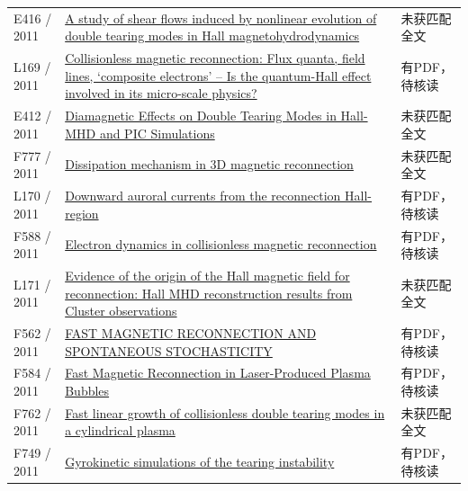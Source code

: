 \begin{longtable}{P{24mm}P{97mm}P{27mm}}
E416 / 2011 & \href{https://doi.org/10.1140/epjd/e2011-20106-4}{A study of shear flows induced by nonlinear evolution of double tearing modes in Hall magnetohydrodynamics} & 未获匹配全文\\

L169 / 2011 & \href{https://doi.org/10.48550/arxiv.1103.1076}{Collisionless magnetic reconnection: Flux quanta,  field lines,  `composite electrons' -- Is the quantum-Hall effect involved in its micro-scale physics?} & 有PDF，待核读\\

E412 / 2011 & \href{https://ui.adsabs.harvard.edu/abs/2011APS..DPPNP9019A/abstract}{Diamagnetic Effects on Double Tearing Modes in Hall-MHD and PIC Simulations} & 未获匹配全文\\

F777 / 2011 & \href{https://doi.org/10.1063/1.3642609}{Dissipation mechanism in 3D magnetic reconnection} & 未获匹配全文\\

L170 / 2011 & \href{https://doi.org/10.5194/angeo-29-679-2011}{Downward auroral currents from the reconnection Hall-region} & 有PDF，待核读\\

F588 / 2011 & \href{https://doi.org/10.1007/s11434-011-4440-0}{Electron dynamics in collisionless magnetic reconnection} & 有PDF，待核读\\

L171 / 2011 & \href{https://doi.org/10.1029/2011ja016991}{Evidence of the origin of the Hall magnetic field for reconnection: Hall MHD reconstruction results from Cluster observations} & 未获匹配全文\\

F562 / 2011 & \href{https://doi.org/10.1088/0004-637x/743/1/51}{FAST MAGNETIC RECONNECTION AND SPONTANEOUS STOCHASTICITY} & 有PDF，待核读\\

F584 / 2011 & \href{https://doi.org/10.1103/physrevlett.106.215003}{Fast Magnetic Reconnection in Laser-Produced Plasma Bubbles} & 有PDF，待核读\\

F762 / 2011 & \href{https://doi.org/10.1088/0029-5515/51/3/033003}{Fast linear growth of collisionless double tearing modes in a cylindrical plasma} & 未获匹配全文\\

F749 / 2011 & \href{https://doi.org/10.1063/1.3659035}{Gyrokinetic simulations of the tearing instability} & 有PDF，待核读\\


\end{longtable}
